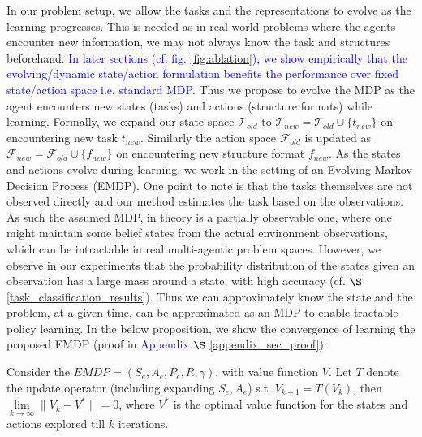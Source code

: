 In our problem setup, we allow the tasks and the representations to evolve as the learning progresses. This is needed as in real world problems where the agents encounter new information, we may not always know the task and structures beforehand. \textcolor{blue}{In later sections (cf. fig. \ref{fig:ablation}), we show empirically that the evolving/dynamic state/action formulation benefits the performance over fixed state/action space i.e. standard MDP}. Thus we propose to evolve the MDP as the agent encounters new states (tasks) and actions (structure formats) while learning. Formally, we expand our state space $\mathcal{T}_{old}$ to $\mathcal{T}_{new} =\mathcal{T}_{old} \cup \{t_{new}\}$ on encountering new task $t_{new}$. Similarly the action space $\mathcal{F}_{old}$ is updated as $\mathcal{F}_{new} =\mathcal{F}_{old} \cup \{f_{new}\}$ on encountering new structure format $f_{new}$. As the states and actions evolve during learning, we work in the setting of an Evolving
Markov Decision Process (EMDP). One point to note is that the tasks themselves are not observed directly and our method estimates the task based on the observations. As such the assumed MDP, in theory is a partially observable one, where one might maintain some belief states from the actual environment observations, which can be intractable in real multi-agentic problem spaces. However, we observe in our experiments that the probability distribution of the states given an observation has a large mass around a state, with high accuracy (cf. $\S$ \ref{task_classification_results}). Thus we can approximately know the state and the problem, at a given time, can be approximated as an MDP to enable tractable policy learning. In the below proposition, we show the convergence of learning the proposed EMDP (proof in \textcolor{blue}{Appendix} $\S$ \ref{appendix_sec_proof}):

\begin{proposition}\label{prop_emdp_convergence}
    Consider the $EMDP = (S_e, A_e, P_e, R, \gamma)$, with value function $V$. 
    Let $T$ denote the update operator (including expanding $S_e, A_e$) s.t. $V_{k+1}=T(V_{k})$, then $\underset{k \rightarrow \infty}{\lim} \lVert V_k - V^* \rVert = 0$, where $V^*$ is the optimal value function for the states and actions explored till $k$ iterations.
\end{proposition}

